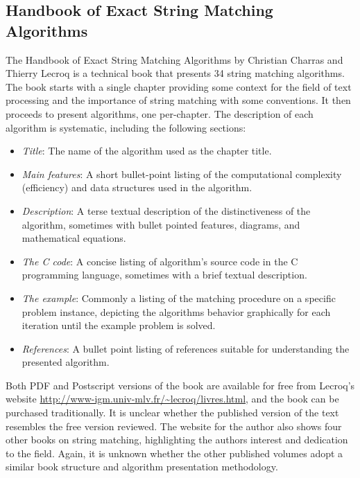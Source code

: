\documentclass[a4paper, 11pt]{article}
\begin{document}
% 
%  
\subsection{Handbook of Exact String Matching Algorithms}
\label{subsec:strings}
The Handbook of Exact String Matching Algorithms by Christian Charras and Thierry Lecroq \cite{Charras2004} is a technical book that presents 34 string matching algorithms. The book starts with a single chapter providing some context for the field of text processing and the importance of string matching with some conventions. It then proceeds to present algorithms, one per-chapter. The description of each algorithm is systematic, including the following sections:

\begin{itemize}
	\item \emph{Title}: The name of the algorithm used as the chapter title.
	\item \emph{Main features}: A short bullet-point listing of the computational complexity (efficiency) and data structures used in the algorithm.
	\item \emph{Description}: A terse textual description of the distinctiveness of the algorithm, sometimes with bullet pointed features, diagrams, and mathematical equations. 
	\item \emph{The C code}: A concise listing of algorithm's source code in the C programming language, sometimes with a brief textual description.
	\item \emph{The example}: Commonly a listing of the matching procedure on a specific problem instance, depicting the algorithms behavior graphically for each iteration until the example problem is solved.
	\item \emph{References}: A bullet point listing of references suitable for understanding the presented algorithm.
\end{itemize}

Both PDF and Postscript versions of the book are available for free from Lecroq's website \url{http://www-igm.univ-mlv.fr/~lecroq/livres.html}, and the book can be purchased traditionally. It is unclear whether the published version of the text resembles the free version reviewed. The website for the author also shows four other books on string matching, highlighting the authors interest and dedication to the field. Again, it is unknown whether the other published volumes adopt a similar book structure and algorithm presentation methodology.
\end{document}
